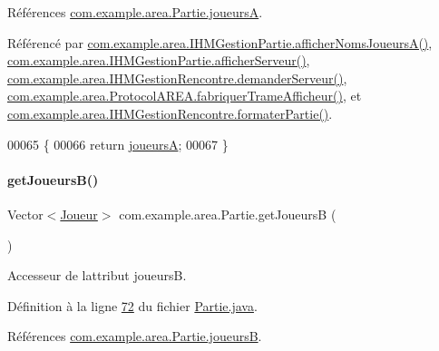 Références \hyperlink{_partie_8java_source_l00037}{com.\+example.\+area.\+Partie.\+joueursA}.



Référencé par \hyperlink{_i_h_m_gestion_partie_8java_source_l00401}{com.\+example.\+area.\+I\+H\+M\+Gestion\+Partie.\+afficher\+Noms\+Joueurs\+A()}, \hyperlink{_i_h_m_gestion_partie_8java_source_l00447}{com.\+example.\+area.\+I\+H\+M\+Gestion\+Partie.\+afficher\+Serveur()}, \hyperlink{_i_h_m_gestion_rencontre_8java_source_l00222}{com.\+example.\+area.\+I\+H\+M\+Gestion\+Rencontre.\+demander\+Serveur()}, \hyperlink{_protocol_a_r_e_a_8java_source_l00048}{com.\+example.\+area.\+Protocol\+A\+R\+E\+A.\+fabriquer\+Trame\+Afficheur()}, et \hyperlink{_i_h_m_gestion_rencontre_8java_source_l00343}{com.\+example.\+area.\+I\+H\+M\+Gestion\+Rencontre.\+formater\+Partie()}.


\begin{DoxyCode}
00065     \{
00066         \textcolor{keywordflow}{return} \hyperlink{classcom_1_1example_1_1area_1_1_partie_a190a033a96ec435589ac53f78d60890b}{joueursA};
00067     \}
\end{DoxyCode}
\mbox{\label{classcom_1_1example_1_1area_1_1_partie_a3c6b981de54d03eeb553919983ee3be8}} 
\paragraph{\texorpdfstring{get\+Joueurs\+B()}{getJoueursB()}}
{\footnotesize\ttfamily Vector$<$\hyperlink{classcom_1_1example_1_1area_1_1_joueur}{Joueur}$>$ com.\+example.\+area.\+Partie.\+get\+JoueursB (\begin{DoxyParamCaption}{ }\end{DoxyParamCaption})}



Accesseur de l\textquotesingle{}attribut joueursB. 



Définition à la ligne \hyperlink{_partie_8java_source_l00072}{72} du fichier \hyperlink{_partie_8java_source}{Partie.\+java}.



Références \hyperlink{_partie_8java_source_l00038}{com.\+example.\+area.\+Partie.\+joueursB}.



